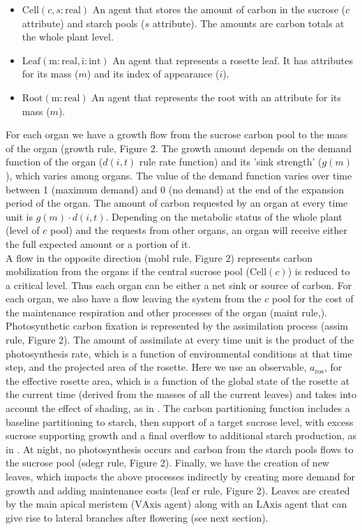 \documentclass[phd]{infthesis}
\newcommand{\mr}[1]{\mathrm{#1}}
\begin{document}
\begin{itemize}
\item
  \(\mr{Cell}(c,s:\mr{real})\) An agent that stores the amount of
  carbon in the sucrose (\(c\) attribute) and starch pools (\(s\)
  attribute). The amounts are carbon totals at the whole plant level.
\item
  \(\mr{Leaf}(\mr{m}:\mr{real},\mr{i}:\mr{int})\) An agent that represents a
  rosette leaf. It has attributes for its mass (\(m\)) and its index of
  appearance (\(i\)).
\item
  \(\mr{Root}(\mr{m}:\mr{real})\) An agent that represents the root with
  an attribute for its mass (\(m\)).
\end{itemize}

For each organ we have a growth flow from the sucrose carbon pool to the mass of
the organ (growth rule, Figure 2. The growth amount depends on the demand
function of the organ (\(d(i,t)\) rule rate function) and its 'sink strength'
(\(g(m)\)), which varies among organs. The value of the demand function varies
over time between 1 (maximum demand) and 0 (no demand) at the end of the
expansion period of the organ. The amount of carbon requested by an organ at
every time unit is \(g( m ) \cdot d(i,t)\). Depending on the
metabolic status of the whole plant (level of \(c\) pool) and the requests from
other organs, an organ will receive either the full expected amount or a
portion of it.\\
A flow in the opposite direction (mobl rule, ­­­Figure 2) represents carbon
mobilization from the organs if the central sucrose pool (\(\mr{Cell}(c)\)) is
reduced to a critical level. Thus each organ can be either a net sink or source
of carbon. For each organ, we also have a flow leaving the system from the \(c\)
pool for the cost of the maintenance respiration and other processes of the
organ (maint rule,). Photosynthetic carbon fixation is represented
by the assimilation process (assim rule, Figure 2). The amount of assimilate
at every time unit is the product of the photosynthesis rate, which is a
function of environmental conditions at that time step, and the projected area
of the rosette. Here we use an observable, \(a_{\mr{ros}}\), for the effective
rosette area, which is a function of the global state of the rosette at the
current time (derived from the masses of all the current leaves) and takes into
account the effect of shading, as in \citet{chew_multiscale_2014}. The carbon
partitioning function includes a baseline partitioning to starch, then support
of a target sucrose level, with excess sucrose supporting growth and a final
overflow to additional starch production, as in \citet{chew_multiscale_2014}. At
night, no photosynthesis occurs and carbon from the starch pools flows to the
sucrose pool (sdegr rule, Figure 2). Finally, we have the creation of new
leaves, which impacts the above processes indirectly by creating more demand for
growth and adding maintenance costs (leaf cr rule, ­­­Figure 2). Leaves are
created by the main apical meristem (\(\mr{VAxis}\) agent) along with an
\(\mr{LAxis}\) agent that can give rise to lateral branches after flowering
(see next section).
\end{document}

